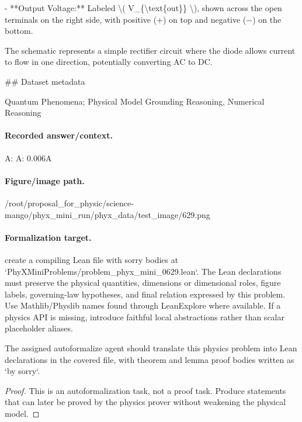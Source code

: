 - **Output Voltage:** Labeled \textbackslash{}( V\_\{\textbackslash{}text\{out\}\} \textbackslash{}), shown across the open terminals on the right side, with positive (+) on top and negative (−) on the bottom.

The schematic represents a simple rectifier circuit where the diode allows current to flow in one direction, potentially converting AC to DC.

\#\# Dataset metadata

Quantum Phenomena; Physical Model Grounding Reasoning, Numerical Reasoning

\paragraph{Recorded answer/context.}
A: A: 0.006A

\paragraph{Figure/image path.}
/root/proposal\_for\_physic/science-mango/phyx\_mini\_run/phyx\_data/test\_image/629.png

\paragraph{Formalization target.}
create a compiling Lean file with sorry bodies at `PhyXMiniProblems/problem\_phyx\_mini\_0629.lean`. The Lean declarations must preserve the physical quantities, dimensions or dimensional roles, figure labels, governing-law hypotheses, and final relation expressed by this problem.
Use Mathlib/Physlib names found through LeanExplore where available. If a physics API is missing, introduce faithful local abstractions rather than scalar placeholder aliases.

\begin{theorem}
\label{thm:physics:phyx_mini_0629:target}
The assigned autoformalize agent should translate this physics problem into Lean declarations in the covered file, with theorem and lemma proof bodies written as `by sorry`.
\end{theorem}
\begin{proof}
This is an autoformalization task, not a proof task. Produce statements that can later be proved by the physics prover without weakening the physical model.
\end{proof}

